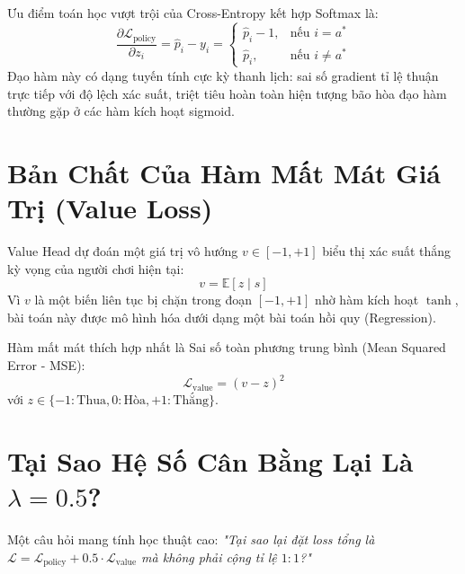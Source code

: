 \documentclass[11pt,a4paper]{report}
\begin{document}
Ưu điểm toán học vượt trội của Cross-Entropy kết hợp Softmax là:
\begin{equation}
    \frac{\partial \mathcal{L}_{\text{policy}}}{\partial z_i} = \hat{p}_i - y_i = \begin{cases} \hat{p}_i - 1, & \text{nếu } i = a^* \\ \hat{p}_i, & \text{nếu } i \neq a^* \end{cases}
\end{equation}
Đạo hàm này có dạng tuyến tính cực kỳ thanh lịch: sai số gradient tỉ lệ thuận trực tiếp với độ lệch xác suất, triệt tiêu hoàn toàn hiện tượng bão hòa đạo hàm thường gặp ở các hàm kích hoạt sigmoid.

\section{Bản Chất Của Hàm Mất Mát Giá Trị (Value Loss)}

Value Head dự đoán một giá trị vô hướng $v \in [-1, +1]$ biểu thị xác suất thắng kỳ vọng của người chơi hiện tại:
\begin{equation}
    v = \mathbb{E}[z \mid s]
\end{equation}
Vì $v$ là một biến liên tục bị chặn trong đoạn $[-1, +1]$ nhờ hàm kích hoạt $\tanh$, bài toán này được mô hình hóa dưới dạng một bài toán hồi quy (Regression).

Hàm mất mát thích hợp nhất là Sai số toàn phương trung bình (Mean Squared Error - MSE):
\begin{equation}
    \mathcal{L}_{\text{value}} = (v - z)^2
\end{equation}
với $z \in \{-1: \text{Thua}, 0: \text{Hòa}, +1: \text{Thắng}\}$.

\section{Tại Sao Hệ Số Cân Bằng Lại Là $\lambda = 0.5$?}

Một câu hỏi mang tính học thuật cao: \textit{"Tại sao lại đặt loss tổng là $\mathcal{L} = \mathcal{L}_{\text{policy}} + 0.5 \cdot \mathcal{L}_{\text{value}}$ mà không phải cộng tỉ lệ $1:1$?"}
\end{document}
